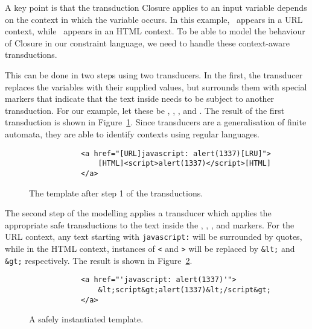 A key point is that the transduction Closure applies to an input variable depends on the context in which the variable occurs.
In this example, \linkvar\ appears in a URL context, while \linktextvar\ appears in an HTML context.
To be able to model the behaviour of Closure in our constraint language, we need to handle these context-aware transductions.

This can be done in two steps using two transducers.
In the first, the transducer replaces the variables with their supplied values, but surrounds them with special markers that indicate that the text inside needs to be subject to another transduction.
For our example, let these be \urlstarttag, \urlendtag, \htmlstarttag, and \htmlendtag.
The result of the first transduction is shown in Figure~\ref{fig:closure-step-one}.
Since transducers are a generalisation of finite automata, they are able to identify contexts using regular languages.

\begin{figure}
    \begin{verbatim}
            <a href="[URL]javascript: alert(1337)[LRU]">
                [HTML]<script>alert(1337)</script>[HTML]
            </a>
    \end{verbatim}
    \caption{\label{fig:closure-step-one}The template after step 1 of the transductions.}
\end{figure}

The second step of the modelling applies a transducer which applies the appropriate safe transductions to the text inside the \urlstarttag, \urlendtag, \htmlstarttag, and \htmlendtag markers.
For the URL context, any text starting with \texttt{javascript:} will be surrounded by quotes, while in the HTML context, instances of \texttt{<} and \texttt{>} will be replaced by \texttt{\&lt;} and \texttt{\&gt;} respectively.
The result is shown in Figure~\ref{fig:closure-safe}.


\begin{figure}
    \begin{verbatim}
            <a href="'javascript: alert(1337)'">
                &lt;script&gt;alert(1337)&lt;/script&gt;
            </a>
    \end{verbatim}
    \caption{\label{fig:closure-safe}A safely instantiated template.}
\end{figure}


